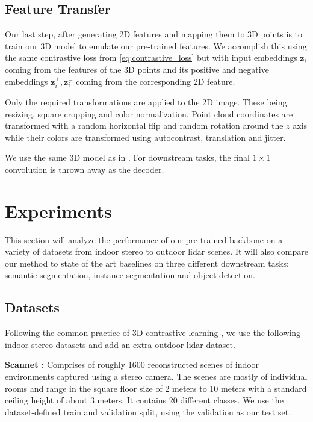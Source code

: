 \documentclass[10pt,twocolumn,letterpaper]{article}
\newcommand{\AJ}[1]{{\color{red}{[Andrej: #1]}}}
\begin{document}
\subsection{Feature Transfer}
\label{sec:featureTransfer}

Our last step, after generating 2D features and mapping them to 3D points is to train our 3D model to emulate our pre-trained features. We accomplish this using the same contrastive loss from \ref{eq:contrastive_loss} but with input embeddings $\mathbf{z}_i$ coming from the features of the 3D points and its positive and negative embeddings $\mathbf{z}_i^{+},\mathbf{z}_i^{-}$ coming from the corresponding 2D feature.

Only the required transformations are applied to the 2D image. These being: resizing, square cropping and color normalization. Point cloud coordinates are transformed with a random horizontal flip and random rotation around the $z$ axis while their colors are transformed using autocontrast, translation and jitter.

We use the same 3D model as in \cite{xie2020pointcontrast}. For downstream tasks, the final $1\times1$ convolution is thrown away as the decoder.

\AJ{Need to look at not using a projection head in 3D model.}

\clearpage
\section{Experiments}
\label{sec:results}

This section will analyze the performance of our pre-trained backbone on a variety of datasets from indoor stereo to outdoor lidar scenes. It will also compare our method to state of the art baselines on three different downstream tasks: semantic segmentation, instance segmentation and object detection.

\subsection{Datasets}
\label{sec:results:datasets}

Following the common practice of 3D contrastive learning \cite{xie2020pointcontrast, hou2021Exploring, zhang2021Self, jiang2021Guided}, we use the following indoor stereo datasets and add an extra outdoor lidar dataset.

\textbf{Scannet \cite{Dai2017ScanNet}:} Comprises of roughly 1600 reconstructed scenes of indoor environments captured using a stereo camera. The scenes are mostly of individual rooms and range in the square floor size of 2 meters to 10 meters with a standard ceiling height of about 3 meters. It contains 20 different classes. We use the dataset-defined train and validation split, using the validation as our test set.
\end{document}
